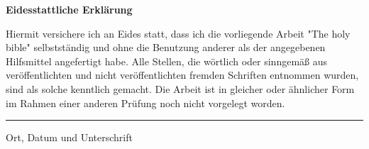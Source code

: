 \newpage
{}
\label{erklaerung}
\vspace*{1cm}

\vspace{1cm}

\Large{\textbf{Eidesstattliche Erklärung}}
\normalsize
\vspace{1cm}

Hiermit versichere ich an Eides statt, dass ich die vorliegende Arbeit 
"The holy bible" selbstständig
 und ohne die Benutzung anderer als der angegebenen Hilfsmittel angefertigt habe. 
 Alle Stellen, die wörtlich oder sinngemäß aus veröffentlichten und nicht veröffentlichten fremden Schriften entnommen wurden, sind als solche kenntlich gemacht. 
 Die Arbeit ist in gleicher oder ähnlicher Form im Rahmen einer anderen Prüfung noch nicht vorgelegt worden.

\vspace*{3.5cm}

\begin{center}
    \rule{0.8\textwidth}{0.4pt}

Ort, Datum und Unterschrift\\

\end{center}
